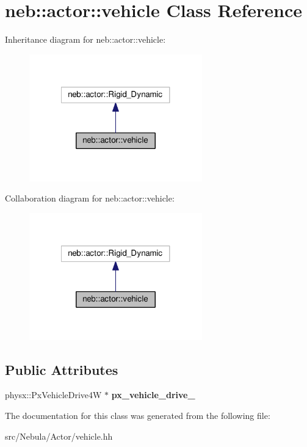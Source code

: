 \hypertarget{classneb_1_1actor_1_1vehicle}{\section{neb\-:\-:actor\-:\-:vehicle Class Reference}
\label{classneb_1_1actor_1_1vehicle}
}


Inheritance diagram for neb\-:\-:actor\-:\-:vehicle\-:
\nopagebreak
\begin{figure}[H]
\begin{center}
\leavevmode
\includegraphics[width=212pt]{classneb_1_1actor_1_1vehicle__inherit__graph}
\end{center}
\end{figure}


Collaboration diagram for neb\-:\-:actor\-:\-:vehicle\-:
\nopagebreak
\begin{figure}[H]
\begin{center}
\leavevmode
\includegraphics[width=212pt]{classneb_1_1actor_1_1vehicle__coll__graph}
\end{center}
\end{figure}
\subsection*{Public Attributes}
\begin{DoxyCompactItemize}
\item 
\hypertarget{classneb_1_1actor_1_1vehicle_ae954f4c54a3a05c8d99ead4a2c6391f1}{physx\-::\-Px\-Vehicle\-Drive4\-W $\ast$ {\bfseries px\-\_\-vehicle\-\_\-drive\-\_\-}}\label{classneb_1_1actor_1_1vehicle_ae954f4c54a3a05c8d99ead4a2c6391f1}

\end{DoxyCompactItemize}


The documentation for this class was generated from the following file\-:\begin{DoxyCompactItemize}
\item 
src/\-Nebula/\-Actor/vehicle.\-hh\end{DoxyCompactItemize}
